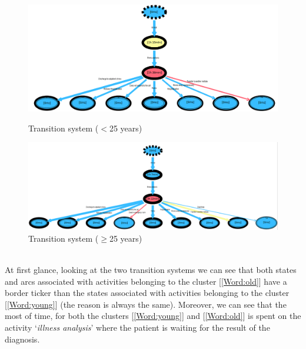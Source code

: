 \begin{figure} [htbp]
\includegraphics[width=\textwidth , keepaspectratio]{ProntoSoccorsoSojournYoungs}
\caption{Transition system ($<$25 years)}
\includegraphics[width=\textwidth , keepaspectratio]{ProntoSoccorsoSojournOlds}
\caption{Transition system ($\geq$25 years)}
\end{figure} \\
At first glance, looking at the two transition systems we can see that both states and arcs associated with activities belonging to the cluster [\ref{Word:old}] have a border ticker than the states associated with activities belonging to the cluster [\ref{Word:young}] (the reason is always the same). Moreover, we can see that the most of time, for both the clusters [\ref{Word:young}] and [\ref{Word:old}] is spent on the activity `\textit{illness analysis}' where the patient is waiting for the result of the diagnosis.
\clearpage
